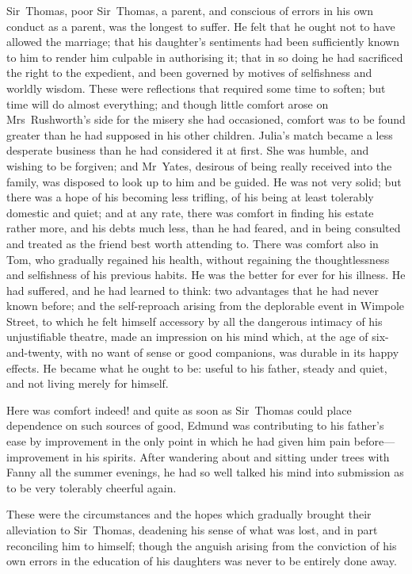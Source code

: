Sir~Thomas, poor Sir~Thomas, a parent, and conscious of errors in his own conduct as a parent, was the longest to suffer. He felt that he ought not to have allowed the marriage; that his daughter's sentiments had been sufficiently known to him to render him culpable in authorising it; that in so doing he had sacrificed the right to the expedient, and been governed by motives of selfishness and worldly wisdom. These were reflections that required some time to soften; but time will do almost everything; and though little comfort arose on Mrs~Rushworth's side for the misery she had occasioned, comfort was to be found greater than he had supposed in his other children. Julia's match became a less desperate business than he had considered it at first. She was humble, and wishing to be forgiven; and Mr~Yates, desirous of being really received into the family, was disposed to look up to him and be guided. He was not very solid; but there was a hope of his becoming less trifling, of his being at least tolerably domestic and quiet; and at any rate, there was comfort in finding his estate rather more, and his debts much less, than he had feared, and in being consulted and treated as the friend best worth attending to. There was comfort also in Tom, who gradually regained his health, without regaining the thoughtlessness and selfishness of his previous habits. He was the better for ever for his illness. He had suffered, and he had learned to think: two advantages that he had never known before; and the self-reproach arising from the deplorable event in Wimpole Street, to which he felt himself accessory by all the dangerous intimacy of his unjustifiable theatre, made an impression on his mind which, at the age of six-and-twenty, with no want of sense or good companions, was durable in its happy effects. He became what he ought to be: useful to his father, steady and quiet, and not living merely for himself.

Here was comfort indeed! and quite as soon as Sir~Thomas could place dependence on such sources of good, Edmund was contributing to his father's ease by improvement in the only point in which he had given him pain before—improvement in his spirits. After wandering about and sitting under trees with Fanny all the summer evenings, he had so well talked his mind into submission as to be very tolerably cheerful again.

These were the circumstances and the hopes which gradually brought their alleviation to Sir~Thomas, deadening his sense of what was lost, and in part reconciling him to himself; though the anguish arising from the conviction of his own errors in the education of his daughters was never to be entirely done away.

